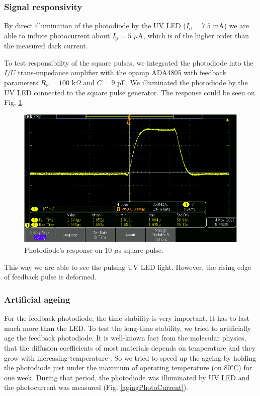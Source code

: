 \subsubsection{Signal responsivity}
By direct illumination of the photodiode by the UV LED ($I_\textrm{d} = 7.5 $ mA) we are able to induce photocurrent about $I_\textrm{p} = 5$ $\mu$A, which is of the higher order than the measured dark current.
\par
To test responsibility of the square pulses, we integrated the photodiode into the $I/U$ trans-impedance amplifier with the opamp ADA4805 with feedback parameters $R_\textrm{F} = 100$ k$\Omega$ and $C = 9$ pF. We illuminated the photodiode by the UV LED connected to the square pulse generator. The response could be seen on Fig. \ref{response}.

\begin{figure}[H]
 \centering
 \includegraphics[scale=0.5]{./pictures/pulse}
 \caption{Photodiode's response on 10 $\mu$s square pulse.}
 \label{response}
\end{figure}


This way we are able to see the pulsing UV LED light. However, the rising edge of feedback pulse is deformed. 

\subsubsection{Artificial ageing}
For the feedback photodiode, the time stability is very important. It has to last much more than the LED. To test the long-time stability, we tried to artificially age the feedback photodiode. It is well-known fact from the molecular physics, that the diffusion coefficients of most materials depends on temperature and they grow with increasing temperature \cite{Diff}. So we tried to speed up the ageing by holding the photodiode just under the maximum of operating temperature (on $80 ^{\circ}$C) for one week. During that period, the photodiode was illuminated by UV LED and the photocurrent was measured (Fig. \ref{agingPhotoCurrent}).


